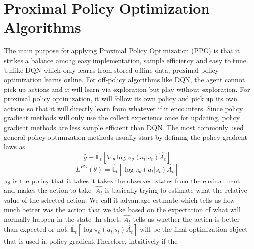 \documentclass[journal,onecolumn]{IEEEtran}
\begin{document}
\section{ Proximal Policy Optimization Algorithms}
The main purpose for applying Proximal Policy Optimization (PPO) is that it strikes a balance among easy implementation, sample efficiency and easy to tune. Unlike DQN which only learns from stored offline data, proximal policy optimization learns online. For off-policy algorithms like DQN, the agent cannot pick up actions and it will learn via exploration but play without exploration. For proximal policy optimization, it will follow its own policy and pick up its own actions so that it will directly learn from whatever if it encounters. Since policy gradient methods will only use the collect experience once for updating, policy gradient methods are less sample efficient than DQN. The most commonly used general policy optimization methods usually start by defining the policy gradient laws as $$\hat{g} = \hat{\mathbb{E}}_{t}[\nabla_{\theta}\log\pi_{\theta}(a_{t}|s_{t})\hat{A_t}] $$ 
$$L^{PG}(\theta) = \hat{\mathbb{E}}_{t}[\log\pi_{\theta}(a_{t}|s_{t})\hat{A_t}] $$ $\pi_{\theta}$ is the policy that it takes it takes the observed states from the environment and makes the action to take. $\hat{A_t}$ is basically trying to estimate what the relative value of the selected action. We call it advantage estimate which tells us how much better was the action that we take based on the expectation of what will normally happen in the state. In short, $\hat{A_t}$ tells us whether the action is better than expected or not. $\hat{\mathbb{E}}_{t}[\log\pi_{\theta}(a_{t}|s_{t})\hat{A_t}]$ will be the final optimization object that is used in policy gradient.Therefore, intuitively if the 
\end{document}
